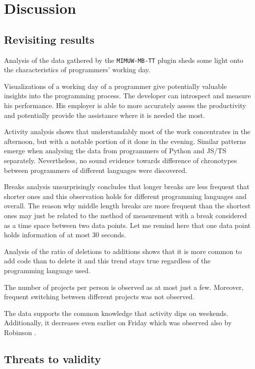 \chapter{Discussion}\label{ch:discussion}

\section{Revisiting results}

Analysis of the data gathered by the \texttt{MIMUW-MB-TT} plugin sheds some light onto the characteristics of programmers' working day.

Visualizations of a working day of a programmer give potentially valuable insights into the programming process. The developer can introspect and measure his performance. His employer is able to more accurately assess the productivity and potentially provide the assistance where it is needed the most.

Activity analysis shows that understandably most of the work concentrates in the afternoon, but with a notable portion of it done in the evening. Similar patterns emerge when analysing the data from programmers of Python and JS/TS separately. Nevertheless, no sound evidence towards difference of chronotypes between programmers of different languages were discovered.

Breaks analysis unsurprisingly concludes that longer breaks are less frequent that shorter ones and this observation holds for different programming languages and overall. The reason why middle length breaks are more frequent than the shortest ones may just be related to the method of measurement with a break considered as a time space between two data points. Let me remind here that one data point holds information of at most 30 seconds.

Analysis of the ratio of deletions to additions shows that it is more common to add code than to delete it and this trend stays true regardless of the programming language used.

The number of projects per person is observed as at most just a few. Moreover, frequent switching between different projects was not observed.

The data supports the common knowledge that activity dips on weekends. Additionally, it decreases even earlier on Friday which was observed also by Robinson \cite{Rob17LangsUsedAtNight}.

\section{Threats to validity}

